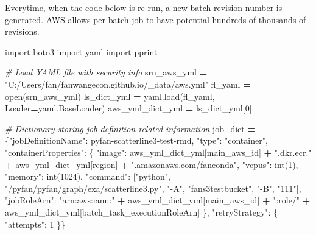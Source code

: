 \documentclass[
]{book}
\newenvironment{Shaded}{\begin{snugshade}}{\end{snugshade}}
\newcommand{\BuiltInTok}[1]{#1}
\newcommand{\CommentTok}[1]{\textcolor[rgb]{0.56,0.35,0.01}{\textit{#1}}}
\newcommand{\DecValTok}[1]{\textcolor[rgb]{0.00,0.00,0.81}{#1}}
\newcommand{\ImportTok}[1]{#1}
\newcommand{\NormalTok}[1]{#1}
\newcommand{\OperatorTok}[1]{\textcolor[rgb]{0.81,0.36,0.00}{\textbf{#1}}}
\newcommand{\StringTok}[1]{\textcolor[rgb]{0.31,0.60,0.02}{#1}}
\begin{document}
Everytime, when the code below is re-run, a new batch revision number is generated. AWS allows per batch job to have potential hundreds of thousands of revisions.

\begin{Shaded}
\begin{Highlighting}[]
\ImportTok{import}\NormalTok{ boto3}
\ImportTok{import}\NormalTok{ yaml}
\ImportTok{import}\NormalTok{ pprint}

\CommentTok{\# Load YAML file with security info}
\NormalTok{srn\_aws\_yml }\OperatorTok{=} \StringTok{"C:/Users/fan/fanwangecon.github.io/\_data/aws.yml"}
\NormalTok{fl\_yaml }\OperatorTok{=} \BuiltInTok{open}\NormalTok{(srn\_aws\_yml)}
\NormalTok{ls\_dict\_yml }\OperatorTok{=}\NormalTok{ yaml.load(fl\_yaml, Loader}\OperatorTok{=}\NormalTok{yaml.BaseLoader)}
\NormalTok{aws\_yml\_dict\_yml }\OperatorTok{=}\NormalTok{ ls\_dict\_yml[}\DecValTok{0}\NormalTok{]}

\CommentTok{\# Dictionary storing job definition related information}
\NormalTok{job\_dict }\OperatorTok{=}\NormalTok{ \{}\StringTok{"jobDefinitionName"}\NormalTok{: }\StringTok{\textquotesingle{}pyfan{-}scatterline3{-}test{-}rmd\textquotesingle{}}\NormalTok{,}
            \StringTok{"type"}\NormalTok{: }\StringTok{"container"}\NormalTok{,}
            \StringTok{"containerProperties"}\NormalTok{: \{}
                \StringTok{"image"}\NormalTok{: aws\_yml\_dict\_yml[}\StringTok{\textquotesingle{}main\_aws\_id\textquotesingle{}}\NormalTok{] }\OperatorTok{+} \StringTok{".dkr.ecr."} \OperatorTok{+}
\NormalTok{                         aws\_yml\_dict\_yml[}\StringTok{\textquotesingle{}region\textquotesingle{}}\NormalTok{] }\OperatorTok{+} \StringTok{".amazonaws.com/fanconda"}\NormalTok{,}
                \StringTok{"vcpus"}\NormalTok{: }\BuiltInTok{int}\NormalTok{(}\DecValTok{1}\NormalTok{),}
                \StringTok{"memory"}\NormalTok{: }\BuiltInTok{int}\NormalTok{(}\DecValTok{1024}\NormalTok{),}
                \StringTok{"command"}\NormalTok{: [}\StringTok{"python"}\NormalTok{,}
                            \StringTok{"/pyfan/pyfan/graph/exa/scatterline3.py"}\NormalTok{,}
                            \StringTok{"{-}A"}\NormalTok{, }\StringTok{"fans3testbucket"}\NormalTok{,}
                            \StringTok{"{-}B"}\NormalTok{, }\StringTok{"111"}\NormalTok{],}
                \StringTok{"jobRoleArn"}\NormalTok{: }\StringTok{"arn:aws:iam::"} \OperatorTok{+}\NormalTok{ aws\_yml\_dict\_yml[}\StringTok{\textquotesingle{}main\_aws\_id\textquotesingle{}}\NormalTok{] }\OperatorTok{+}
                              \StringTok{":role/"} \OperatorTok{+}\NormalTok{ aws\_yml\_dict\_yml[}\StringTok{\textquotesingle{}batch\_task\_executionRoleArn\textquotesingle{}}\NormalTok{]}
\NormalTok{            \},}
            \StringTok{"retryStrategy"}\NormalTok{: \{}
                \StringTok{"attempts"}\NormalTok{: }\DecValTok{1}
\NormalTok{            \}\}}


\end{Highlighting}
\end{Shaded}
\end{document}
